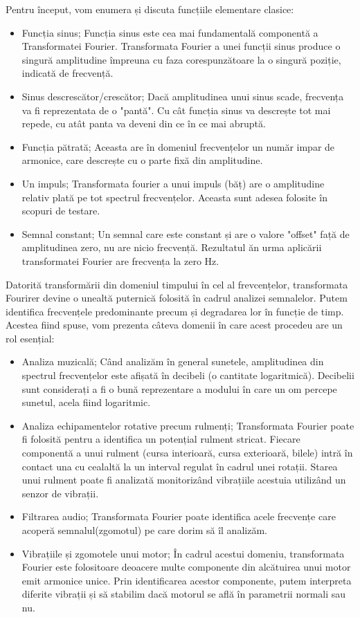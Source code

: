 \documentclass[a4paper,12pt]{report}
\begin{document}
	Pentru început, vom enumera și discuta funcțiile elementare clasice: 
	\begin{itemize}
		\item Funcția sinus; Funcția sinus este cea mai fundamentală componentă a Transformatei Fourier. Transformata Fourier a unei funcții sinus produce o singură amplitudine împreuna cu faza corespunzătoare la o singură poziție, indicată de frecvență.
		\item Sinus descrescător/crescător; Dacă amplitudinea unui sinus scade, frecvența va fi reprezentata de o "pantă". Cu cât funcția sinus va descrește tot mai repede, cu atât panta va deveni din ce în ce mai abruptă.
		\item Funcția pătrată; Aceasta are în domeniul frecvențelor un număr impar de armonice, care descrește cu o parte fixă din amplitudine.
		\item Un impuls; Transformata fourier a unui impuls (băț) are o amplitudine relativ plată pe tot spectrul frecvențelor. Aceasta sunt adesea folosite în scopuri de testare.
		\item Semnal constant; Un semnal care este constant și are o valore "offset" față de amplitudinea zero, nu are nicio frecvență. Rezultatul ăn urma aplicării transformatei Fourier are frecvența la zero Hz.
	\end{itemize}
	
	Datorită transformării din domeniul timpului în cel al frevcențelor, transformata Fourirer devine o unealtă puternică folosită în cadrul analizei semnalelor. Putem identifica frecvențele predominante precum și degradarea lor în funcție de timp. Acestea fiind spuse, vom prezenta câteva domenii în care acest procedeu are un rol esențial:
	\begin{itemize}
		\item Analiza muzicală; Când analizăm în general sunetele, amplitudinea din spectrul frecvențelor este afișată în decibeli (o cantitate logaritmică). Decibelii sunt considerați a fi o bună reprezentare a modului în care un om percepe sunetul, acela fiind logaritmic.
		\item Analiza echipamentelor rotative precum rulmenți; Transformata Fourier poate fi folosită pentru a identifica un potențial rulment stricat. Fiecare componentă a unui rulment (cursa interioară, cursa exterioară, bilele) intră în contact una cu cealaltă la un interval regulat în cadrul unei rotații. Starea unui rulment poate fi analizată monitorizând vibrațiile acestuia utilizând un senzor de vibrații.
		\item Filtrarea audio; Transformata Fourier poate identifica acele frecvențe care acoperă semnalul(zgomotul) pe care dorim să îl analizăm.
		\item Vibrațiile și zgomotele unui motor; În cadrul acestui domeniu, transformata Fourier este folositoare deoacere multe componente din alcătuirea unui motor emit armonice unice. Prin identificarea acestor componente, putem interpreta diferite vibrații și să stabilim dacă motorul se află în parametrii normali sau nu.
	\end{itemize}
\end{document}
